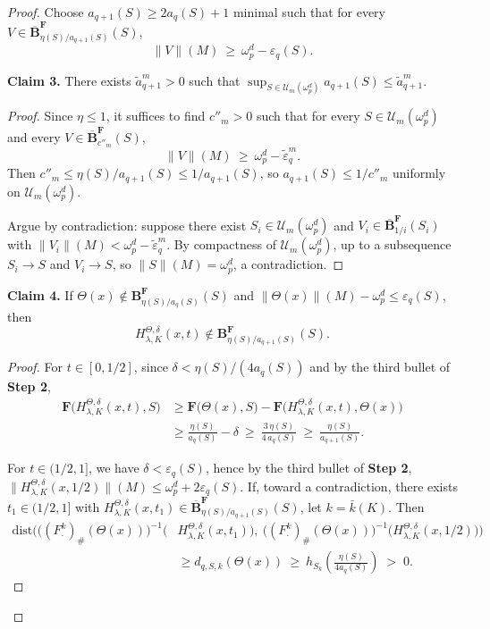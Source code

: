 \documentclass[12pt,english]{article}
\theoremstyle{definition}
\begin{document}
\begin{proof}
Choose $a_{q+1}(S)\ge 2a_q(S)+1$ minimal such that for every $V\in\overline{\mathbf{B}}^{\mathbf F}_{\eta(S)/a_{q+1}(S)}(S)$,
\[
\|V\|(M)\ \ge\ \omega^d_p-\varepsilon_q(S).
\]

\textbf{Claim 3.} There exists $\tilde a^m_{q+1}>0$ such that $\sup_{S\in\mathcal{U}_m(\omega^d_p)} a_{q+1}(S)\le \tilde a^m_{q+1}$.
\begin{proof}
Since $\eta\le 1$, it suffices to find $c''_m>0$ such that for every $S\in\mathcal{U}_m(\omega^d_p)$ and every $V\in\overline{\mathbf{B}}^{\mathbf F}_{c''_m}(S)$,
\[
\|V\|(M)\ \ge\ \omega^d_p-\tilde\varepsilon^m_q.
\]
Then $c''_m\le \eta(S)/a_{q+1}(S)\le 1/a_{q+1}(S)$, so $a_{q+1}(S)\le 1/c''_m$ uniformly on $\mathcal{U}_m(\omega^d_p)$.

Argue by contradiction: suppose there exist $S_i\in\mathcal{U}_m(\omega^d_p)$ and $V_i\in\overline{\mathbf{B}}^{\mathbf F}_{1/i}(S_i)$ with $\|V_i\|(M)<\omega^d_p-\tilde\varepsilon^m_q$. By compactness of $\mathcal{U}_m(\omega^d_p)$, up to a subsequence $S_i\to S$ and $V_i\to S$, so $\|S\|(M)=\omega^d_p$, a contradiction.
\end{proof}

\textbf{Claim 4.} If $\Theta(x)\notin \mathbf{B}^{\mathbf F}_{\eta(S)/a_q(S)}(S)$ and $\|\Theta(x)\|(M)-\omega^d_p\le \varepsilon_q(S)$, then
\[
H^{\Theta,\delta}_{\lambda,K}(x,t)\notin \mathbf{B}^{\mathbf F}_{\eta(S)/a_{q+1}(S)}(S).
\]
\begin{proof}
For $t\in[0,1/2]$, since $\delta<\eta(S)/(4a_q(S))$ and by the third bullet of \textbf{Step 2},
\[
\begin{aligned}
\mathbf{F}\bigl(H^{\Theta,\delta}_{\lambda,K}(x,t),S\bigr)
&\ge \mathbf{F}\bigl(\Theta(x),S\bigr)
 - \mathbf{F}\bigl(H^{\Theta,\delta}_{\lambda,K}(x,t),\Theta(x)\bigr) \\
&\ge \frac{\eta(S)}{a_q(S)} - \delta
\ \ge\ \frac{3\,\eta(S)}{4\,a_q(S)}
\ \ge\ \frac{\eta(S)}{a_{q+1}(S)}.
\end{aligned}
\]


For $t\in(1/2,1]$, we have $\delta<\varepsilon_q(S)$, hence by the third bullet of \textbf{Step 2},
$\|H^{\Theta,\delta}_{\lambda,K}(x,1/2)\|(M)\le \omega^d_p+2\varepsilon_q(S)$. If, toward a contradiction, there exists $t_1\in(1/2,1]$ with
$H^{\Theta,\delta}_{\lambda,K}(x,t_1)\in\overline{\mathbf{B}}^{\mathbf F}_{\eta(S)/a_{q+1}(S)}(S)$, let $k=\bar k(K)$. Then
\[
\begin{aligned}
\mathrm{dist}\!\Big(
\bigl((F^k_{\cdot})_{\#}(\Theta(x))\bigr)^{-1}\!\bigl(&H^{\Theta,\delta}_{\lambda,K}(x,t_1)\bigr),\ 
\bigl((F^k_{\cdot})_{\#}(\Theta(x))\bigr)^{-1}\!\bigl(H^{\Theta,\delta}_{\lambda,K}(x,1/2)\bigr)
\Big) \\
&\ge d_{q,S,k}(\Theta(x))
\ \ge\ h_{S_k}\!\left(\frac{\eta(S)}{4a_q(S)}\right) \;>\; 0.
\end{aligned}
\]


\end{proof}
\end{proof}
\end{document}
